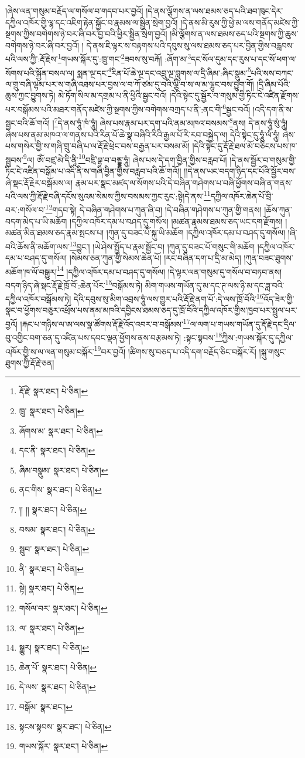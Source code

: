 །ཞེས་ལན་གསུམ་བརྗོད་ལ་གསོལ་བ་གདབ་པར་བྱའོ། །དེ་ནས་ལྕོགས་ན་ལས་ཐམས་ཅད་པའི་ཐབ་ཁུང་དེར་དཀྱིལ་འཁོར་གྱི་ལྷ་དང་འཇིག་རྟེན་སྐྱོང་བ་རྣམས་ལ་སྦྱིན་སྲེག་བྱའོ། །དེ་ནས་མི་རུས་ཀྱི་ཕྱེ་མ་ལས་གནོད་མཛེས་ཀྱི་སྔགས་ཀྱིས་བགེགས་ཉེ་བར་ཞི་བར་བྱ་བའི་ཕྱིར་སྦྱིན་སྲེག་བྱའོ། །མི་ལྕོགས་ན་ལས་ཐམས་ཅད་པའི་སྔགས་ཀྱི་ཆུས་བགེགས་ཉེ་བར་ཞི་བར་བྱའོ། །
དེ་ནས་ཇི་ལྟར་ས་བརྟགས་པའི་དབུས་སུ་ལས་ཐམས་ཅད་པར་བྱིན་གྱིས་བརླབས་པའི་ལས་ཀྱི་:རྡོ་རྗེས་\footnote{རྡོ་རྗེ་  སྣར་ཐང་།  པེ་ཅིན། }གཡས་སྐོར་དུ་:ཁྲུ་གང་\footnote{ཁྲུ་  སྣར་ཐང་།  པེ་ཅིན། }ཟབས་སུ་བརྐོ། :ཞོག་མ་\footnote{ཞོགས་མ་  སྣར་ཐང་།  པེ་ཅིན། }དང་སོལ་དུམ་དང་རུས་པ་དང་སོ་ཕག་ལ་སོགས་པའི་སྐྱོན་བསལ་ལ། སྨན་ལྔ་དང་\footnote{དང་ནི་  སྣར་ཐང་།  པེ་ཅིན། }རིན་པོ་ཆེ་ལྔ་དང་འབྲུ་ལྔ་བླུགས་ལ་དྲི་ཞིམ་:ཞིང་སྣུམ་\footnote{ཞིམ་བསྣུམ་  སྣར་ཐང་།  པེ་ཅིན། }པའི་སས་བཀང་ལ་གྲུ་བཞི་ལྷམ་པར་ས་གཞི་འཐས་པར་བྱས་ལ་བ་ཀོ་ཙམ་དུ་བའི་ལྕི་བ་ས་ལ་མ་ལྷུང་བས་བྱུག་གོ། །དྲི་ཞིམ་པོའི་ཆུས་ཀྱང་བྱུགས་ཏེ། མེ་ཏོག་སིལ་མ་དགྲམ་པ་ནི་ཕྱིའི་སྦྱང་བའོ། །དེའི་སྟེང་དུ་སྦྱོར་བ་གསུམ་གྱི་ཏིང་ངེ་འཛིན་རྫོགས་པར་བསྒོམས་པའི་མཐར་གནོད་མཛེས་ཀྱི་སྔགས་ཀྱིས་བགེགས་བཀྲད་པ་ནི་:ནང་གི་\footnote{ནང་གིས་  སྣར་ཐང་།  པེ་ཅིན། }སྦྱང་བའོ། །འདི་དག་ནི་ས་སྦྱང་བའི་ཆོ་གའོ། །\footnote{།། །།  སྣར་ཐང་།  པེ་ཅིན། }དེ་ནས་ཧཱུཾ་ཁཾ་ཧཱུཾ། ཞེས་པས་རྣམ་པར་དག་པའི་ནམ་མཁའ་བསམས་\footnote{བསམ་  སྣར་ཐང་།  པེ་ཅིན། }ནས། དེ་ནས་ཧཱུཾ་སུཾ་ཧཱུཾ། ཞེས་པས་ནམ་མཁའ་ལ་གནས་པའི་རིན་པོ་ཆེ་སྣ་བཞིའི་རིའི་རྒྱལ་པོ་རི་རབ་བསྐྱེད་ལ། དེའི་སྟེང་དུ་ཧཱུཾ་ལཾ་ཧཱུཾ། ཞེས་པས་གསེར་གྱི་ས་གཞི་གྲུ་བཞི་པ་ལ་རྡོ་རྗེ་ཕྲེང་བས་བརྒྱན་པར་བསམ་མོ། །དེའི་སྟེང་དུ་རྡོ་རྗེ་ཐལ་མོ་བཅིངས་པས་ཁ་སྦུབས་\footnote{སྦུབ་  སྣར་ཐང་།  པེ་ཅིན། }ལ། ཨོཾ་བཛྲ་མེ་དི་ནཱི་\footnote{ནི་  སྣར་ཐང་།  པེ་ཅིན། }བཛྲི་བྷ་བ་བནྡྷ་ཧཱུཾ། ཞེས་པས་དེ་དག་བྱིན་གྱིས་བརླབ་པོ། །དེ་ནས་སྦྱོར་བ་གསུམ་གྱི་ཏིང་ངེ་འཛིན་བསྒོམ་པ་འདི་ནི་ས་གཞི་བྱིན་གྱིས་བརླབ་པའི་ཆོ་གའོ།། །།དེ་ནས་ཡང་བདག་ཉིད་དང་པོའི་སྦྱོར་བས་ཞེ་སྡང་རྡོ་རྗེར་བསྒོམས་ལ། རྣམ་པར་སྣང་མཛད་ལ་སོགས་པའི་དེ་བཞིན་གཤེགས་པ་བཞི་ཕྱོགས་བཞི་ན་གནས་པའི་ལས་ཀྱི་རྡོ་རྗེ་བཞི་དངོས་སུའམ་སེམས་ཀྱིས་བསམས་ཀྱང་རུང་:སྟེ།དེ་ནས་\footnote{སྟེ།  སྣར་ཐང་།  པེ་ཅིན། }དཀྱིལ་འཁོར་ཆེན་པོ་བྲི་བར་:གསོལ་བ་\footnote{གསོལ་བར་  སྣར་ཐང་།  པེ་ཅིན། }གདབ་སྟེ། དེ་བཞིན་གཤེགས་པ་ཀུན་ཞི་བ། །དེ་བཞིན་གཤེགས་པ་ཀུན་གྱི་གནས། །ཆོས་ཀུན་བདག་མེད་པ་ཡི་མཆོག །དཀྱིལ་འཁོར་དམ་པ་བཤད་དུ་གསོལ། །མཚན་རྣམས་ཐམས་ཅད་ཡང་དག་རྫོགས། །མཚན་མིན་ཐམས་ཅད་རྣམ་སྤངས་པ། །ཀུན་དུ་བཟང་པོ་སྐུ་ཡི་མཆོག །དཀྱིལ་འཁོར་དམ་པ་བཤད་དུ་གསོལ། །ཞི་བའི་ཆོས་ནི་མཆོག་ལས་\footnote{ལ་  སྣར་ཐང་།  པེ་ཅིན། }བྱུང་། །ཡེ་ཤེས་སྤྱོད་པ་རྣམ་སྦྱོང་བ། །ཀུན་དུ་བཟང་པོ་གསུང་གི་མཆོག །དཀྱིལ་འཁོར་དམ་པ་བཤད་དུ་གསོལ། །སེམས་ཅན་ཀུན་གྱི་སེམས་ཆེན་པོ། །རང་བཞིན་དག་པ་དྲི་མ་མེད། །ཀུན་བཟང་ཐུགས་མཆོག་ཁ་ལོ་བསྒྱུར།\footnote{སྒྱུར།  སྣར་ཐང་།  པེ་ཅིན། } །དཀྱིལ་འཁོར་དམ་པ་བཤད་དུ་གསོལ། །དེ་ལྟར་ལན་གསུམ་དུ་གསོལ་བ་བཏབ་ནས། བདག་ཉིད་ཞེ་སྡང་རྡོ་རྗེ་ཁྲོ་བོ་:ཆེན་པོར་\footnote{ཆེན་པོ་  སྣར་ཐང་།  པེ་ཅིན། }བསྒོམས་ཏེ། མིག་གཡས་གཡོན་དུ་མ་དང་ཊ་ལས་ཉི་མ་དང་ཟླ་བའི་དཀྱིལ་འཁོར་བསྒོམས་ཏེ། དེའི་དབུས་སུ་མིག་འབྲས་ཧཱུཾ་ལས་གྱུར་པའི་རྡོ་རྗེ་ནག་པོ་:དེ་ལས་ཁྲོ་བོའི་\footnote{དེ་ལས་  སྣར་ཐང་།  པེ་ཅིན། }འོད་ཟེར་གྱི་སྣང་བ་ཕྱོགས་བཅུར་འཕྲོས་པས་ནམ་མཁའི་དབྱིངས་ཐམས་ཅད་དུ་ཁྲོ་བོའི་དཀྱིལ་འཁོར་གྱིས་ཁྱབ་པར་སྤྲུལ་པར་བྱའོ། །རྐང་པ་གཉིས་ལ་ཨ་ལས་སྣ་ཚོགས་རྡོ་རྗེ་འོད་འབར་བ་བསྒོམས་\footnote{བསྒོམ་  སྣར་ཐང་། }ལ་ལག་པ་གཡས་གཡོན་དུ་རྡོ་རྗེ་དང་དྲིལ་བུ་འགྱིང་བག་ཅན་དུ་འཛིན་པས་དབང་ལྡན་ཕྱོགས་ནས་བརྩམས་ཏེ། :སྟང་སྟབས་\footnote{སྟངས་སྟབས་  སྣར་ཐང་།  པེ་ཅིན། }ཀྱིས་:གཡས་སྐོར་དུ་དཀྱིལ་འཁོར་གྱི་ས་ལ་ལན་གསུམ་བསྐོར་\footnote{གཡས་སྐོར་  སྣར་ཐང་།  པེ་ཅིན། }བར་བྱའོ། །ཚིགས་སུ་བཅད་པ་འདི་དག་བརྗོད་ཅིང་བསྐོར་རོ། །སྐུ་གསུང་ཐུགས་ཀྱི་རྡོ་རྗེ་ཅན། 